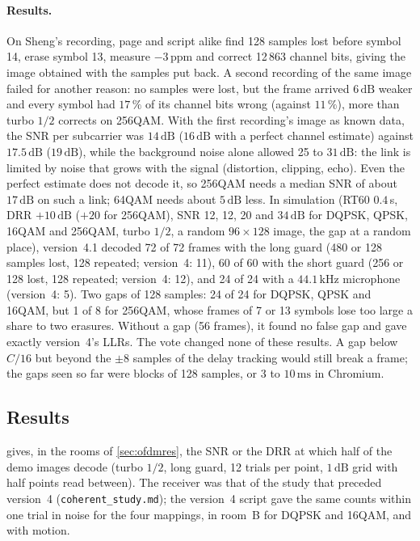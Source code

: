 \documentclass[11pt,a4paper]{article}
\newcommand{\kHz}{\,\mathrm{kHz}}
\newcommand{\ms}{\,\mathrm{ms}}
\newcommand{\dB}{\,\mathrm{dB}}
\newcommand{\code}[1]{\texttt{#1}}
\theoremstyle{remark}
\begin{document}
\paragraph{Results.} On Sheng's recording, page and script alike find 128 samples lost before symbol 14, erase symbol 13, measure $-3$\,ppm and correct 12\,863 channel bits, giving the image obtained with the samples put back. A second recording of the same image failed for another reason: no samples were lost, but the frame arrived $6\dB$ weaker and every symbol had $17\,\%$ of its channel bits wrong (against $11\,\%$), more than turbo $1/2$ corrects on 256QAM. With the first recording's image as known data, the SNR per subcarrier was $14\dB$ ($16\dB$ with a perfect channel estimate) against $17.5\dB$ ($19\dB$), while the background noise alone allowed 25 to $31\dB$: the link is limited by noise that grows with the signal (distortion, clipping, echo). Even the perfect estimate does not decode it, so 256QAM needs a median SNR of about $17\dB$ on such a link; 64QAM needs about $5\dB$ less. In simulation (RT60 $0.4$\,s, DRR $+10\dB$ ($+20$ for 256QAM), SNR 12, 12, 20 and $34\dB$ for DQPSK, QPSK, 16QAM and 256QAM, turbo $1/2$, a random $96 \times 128$ image, the gap at a random place), version~4.1 decoded 72 of 72 frames with the long guard (480 or 128 samples lost, 128 repeated; version~4: 11), 60 of 60 with the short guard (256 or 128 lost, 128 repeated; version~4: 12), and 24 of 24 with a $44.1\kHz$ microphone (version~4: 5). Two gaps of 128 samples: 24 of 24 for DQPSK, QPSK and 16QAM, but 1 of 8 for 256QAM, whose frames of 7 or 13 symbols lose too large a share to two erasures. Without a gap (56 frames), it found no false gap and gave exactly version~4's LLRs. The vote changed none of these results. A gap below $C/16$ but beyond the $\pm 8$ samples of the delay tracking would still break a frame; the gaps seen so far were blocks of 128 samples, or 3 to $10\ms$ in Chromium.

\subsection{Results}
\label{sec:cohres}
 gives, in the rooms of \cref{sec:ofdmres}, the SNR or the DRR at which half of the demo images decode (turbo $1/2$, long guard, 12 trials per point, $1\dB$ grid with half points read between). The receiver was that of the study that preceded version~4 (\code{coherent\_study.md}); the version~4 script gave the same counts within one trial in noise for the four mappings, in room~B for DQPSK and 16QAM, and with motion.
\end{document}
